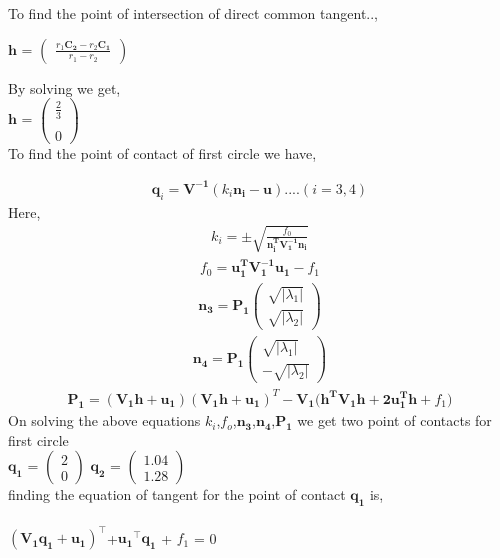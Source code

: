 \documentclass[journal,12pt,twocolumn]{IEEEtran}
\newcommand{\myvec}[1]{\ensuremath{\begin{pmatrix}#1\end{pmatrix}}}
\let\vec\mathbf
\begin{document}
To find the point of intersection of direct common tangent..,
\begin{center}
$\vec{h}$ =  $\myvec{\frac{r_1 \vec{C_2} - r_2 \vec{C_1}}{r_1 - r_2}}$
\end{center}

By solving we get,\\

\hspace*{3cm}$\vec{h}$ = $\myvec{\frac{2}{3} \\ \\ 0}$ \\

To find the point of contact of first circle we have,

\begin{align}
\boxed{\vec{q}_i = \vec{V^{-1}}(k_i\vec{n_i-u})}....(i = 3,4) 
\end{align}
Here, 
\begin{align}
k_i = \pm\sqrt{\frac{f_0}{\vec{n_i^TV_1^{-1}n_i}}}
\end{align}
\begin{align}
f_0 = \vec{u_1^TV_1^{-1}u_1}-f_1
\end{align}
\begin{align}
\vec{n_3} = \vec{P_1}\myvec{\sqrt{|\lambda_1|} \\ \sqrt{|\lambda_2|}}
\end{align}
\begin{align}
\vec{n_4} = \vec{P_1}\myvec{\sqrt{|\lambda_1|} \\ -\sqrt{|\lambda_2|}}
\end{align}
\begin{align}
\vec{P_1} = (\vec{V_1h+u_1})(\vec{V_1h+u_1})^T-\vec{V_1(h^TV_1h+2u_1^Th}+f_1)
\end{align}
On solving the above equations ${k_i}$,${f_o}$,$\vec{n_3}$,$\vec{n_4}$,$\vec{P_1}$ we get two point of contacts for first circle \\

\hspace*{1.5cm}$\vec{q_1}$ = $\myvec{2 \\ 0}$
$\vec{q_2}$ = $\myvec{1.04 \\ 1.28}$ \\

finding the equation of tangent for the point of contact $\vec{q_1}$ is, \\ \\
\hspace*{2cm}$(\vec{V_1}\vec{q_1}+\vec{u_1})^{\top}$+$\vec{u_1}^{\top}\vec{q_1}$ + $f_1$ = 0 \\
\end{document}
